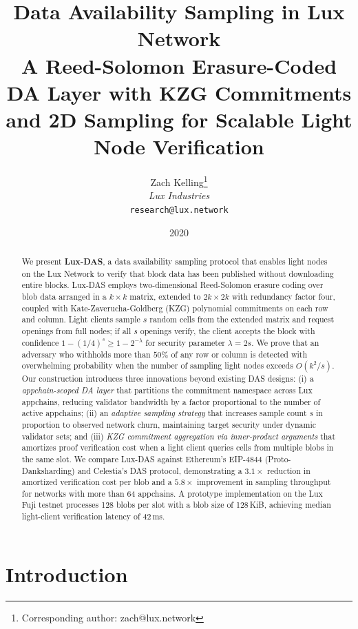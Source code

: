 \documentclass[11pt,a4paper]{article}
\title{\textbf{Data Availability Sampling in Lux Network}\\
\large A Reed-Solomon Erasure-Coded DA Layer with KZG Commitments\\
and 2D Sampling for Scalable Light Node Verification}
\author{
Zach Kelling\thanks{Corresponding author: zach@lux.network}\\
\textit{Lux Industries}\\
\texttt{research@lux.network}
}
\date{2020}
\theoremstyle{plain}
\theoremstyle{definition}
\theoremstyle{remark}
\begin{document}
\luxcoverpage
\maketitle

\begin{abstract}
We present \textbf{Lux-DAS}, a data availability sampling protocol that enables light nodes
on the Lux Network to verify that block data has been published without downloading entire
blocks. Lux-DAS employs two-dimensional Reed-Solomon erasure coding over blob data arranged
in a $k \times k$ matrix, extended to $2k \times 2k$ with redundancy factor four, coupled
with Kate-Zaverucha-Goldberg (KZG) polynomial commitments on each row and column. Light
clients sample $s$ random cells from the extended matrix and request openings from full nodes;
if all $s$ openings verify, the client accepts the block with confidence
$1 - (1/4)^s \geq 1 - 2^{-\lambda}$ for security parameter $\lambda = 2s$. We prove that
an adversary who withholds more than $50\%$ of any row or column is detected with
overwhelming probability when the number of sampling light nodes exceeds
$O(k^2 / s)$. Our construction introduces three innovations beyond existing DAS designs:
(i) a \emph{appchain-scoped DA layer} that partitions the commitment namespace across Lux
appchains, reducing validator bandwidth by a factor proportional to the number of active appchains;
(ii) an \emph{adaptive sampling strategy} that increases sample count $s$ in proportion to
observed network churn, maintaining target security under dynamic validator sets; and
(iii) \emph{KZG commitment aggregation via inner-product arguments} that amortizes proof
verification cost when a light client queries cells from multiple blobs in the same slot.
We compare Lux-DAS against Ethereum's EIP-4844 (Proto-Danksharding) and Celestia's DAS
protocol, demonstrating a $3.1\times$ reduction in amortized verification cost per blob
and a $5.8\times$ improvement in sampling throughput for networks with more than 64 appchains.
A prototype implementation on the Lux Fuji testnet processes 128 blobs per slot with a
blob size of 128\,KiB, achieving median light-client verification latency of 42\,ms.
\end{abstract}

\tableofcontents
\newpage

\section{Introduction}
\label{sec:introduction}
\end{document}

